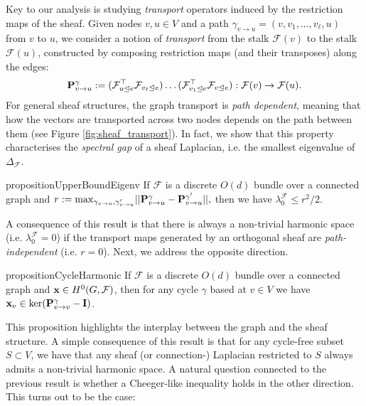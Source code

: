 \documentclass{article}
\def\vx{{\bf{x}}}
\def\mI{{\bf{I}}}
\def\mP{{\bf{P}}}
\newcommand{\tleq}{\trianglelefteq}
\begin{document}
Key to our analysis is studying \emph{transport} operators induced by the restriction maps of the sheaf. Given nodes $v,u \in V$ and a path $\gamma_{v\rightarrow u} = (v, v_{1}, \ldots, v_{\ell}, u)$ from $v$ to $u$, we consider a notion of \emph{transport} from the stalk $\mathcal{F}(v)$ to the stalk $\mathcal{F}(u)$, 
constructed by composing restriction maps (and their transposes) along the edges: \vspace{-1mm}
\[
\mP^{\gamma}_{v\rightarrow u}:=(\mathcal{F}_{u\tleq e}^\top\mathcal{F}_{v_{\ell}\tleq e})\ldots(\mathcal{F}_{v_{1}\tleq e}^\top\mathcal{F}_{v\tleq e}): \mathcal{F}(v)\rightarrow \mathcal{F}(u).
\]
For general sheaf structures, the graph transport is \emph{path dependent}, meaning that how the vectors are transported across two nodes depends on the path between them (see Figure \ref{fig:sheaf_transport}). In fact, we show that this property characterises the {\em spectral gap} of a sheaf Laplacian, i.e. the smallest eigenvalue of $\Delta_{\mathcal{F}}$. 
\begin{restatable}{proposition}{UpperBoundEigenv}\label{prop:upper_bound_eigenv} If $\mathcal{F}$ is a discrete $O(d)$ bundle over a connected graph and $ r := \max_{\gamma_{v\rightarrow u}, \gamma'_{v\rightarrow u}} \lvert\lvert \mP_{v\rightarrow u}^{\gamma} - \mP_{v\rightarrow u}^{\gamma'}\rvert\rvert,$ then we have 
$\lambda_{0}^{\mathcal{F}} \leq r^{2}/{2}$.
\end{restatable}
A consequence of this result is that there is always a non-trivial harmonic space (i.e. $\lambda_{0}^{\mathcal{F}} = 0$) if the transport maps generated by an orthogonal sheaf are \emph{path-independent} (i.e. $r = 0$). Next, we address the opposite direction.\begin{restatable}{proposition}{CycleHarmonic}\label{prop:cycle_harmonic}
If $\mathcal{F}$ is a discrete $O(d)$ bundle over a connected graph and $\vx\in H^{0}(G,\mathcal{F})$, then for any cycle $\gamma$ based at $v\in V$ we have 
$\vx_{v}\in \mathrm{ker}(\mP^{\gamma}_{v\rightarrow v} - \mI)$.
\end{restatable}


This proposition highlights the interplay between the graph and the sheaf structure. A simple consequence of this result is that for any cycle-free subset $S\subset V$, we have that any sheaf (or connection-) Laplacian restricted to $S$ always admits a non-trivial harmonic space. A natural question connected to the previous result is whether a Cheeger-like inequality holds in the other direction. This turns out to be the case:
\end{document}
